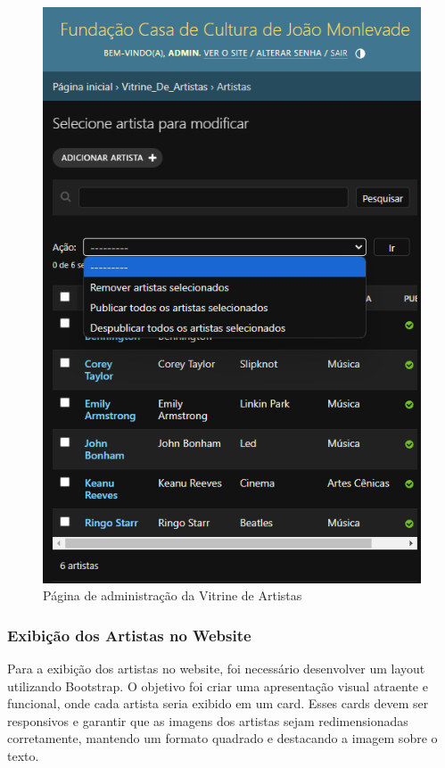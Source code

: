 \begin{figure}[htb]
	\caption{\label{fig_adm_vitrine}Página de administração da Vitrine de Artistas}
	\begin{center}
	    \includegraphics[scale=0.3]{./img/admin_artista.png}
	\end{center}
\end{figure}

\subsubsection{Exibição dos Artistas no Website}

Para a exibição dos artistas no website, foi necessário desenvolver um layout utilizando Bootstrap. O objetivo foi criar uma apresentação visual atraente e funcional, onde cada artista seria exibido em um card. Esses cards devem ser responsivos e garantir que as imagens dos artistas sejam redimensionadas corretamente, mantendo um formato quadrado e destacando a imagem sobre o texto.

